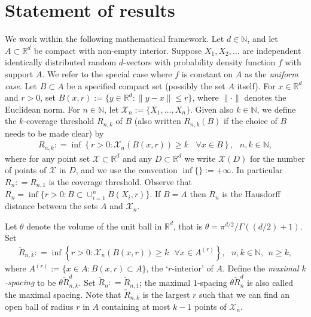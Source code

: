 \documentclass[12pt]{article}
\newcommand{\N}{\mathbb{N}}
\newcommand{\cX}{\mathcal{X}}
\newcommand{\X}{\mathcal{X}}
\newcommand{\tR}{{\tilde{R}}}
\newcommand{\R}{\mathbb{R}}
\newcommand{\eqco}{\setcounter{equation}{0}}
\newcommand{\thco}{\setcounter{theo}{0}}
\newcommand{\prco}{\setcounter{prop}{0}}
\newcommand{\laco}{\setcounter{lemm}{0}}
\newcommand{\coco}{\setcounter{coro}{0}}
\newcommand{\cjco}{\setcounter{conj}{0}}
\newcommand{\deco}{\setcounter{defn}{0}}
\newcommand{\allco}{\eqco  \thco \prco \laco \coco \cjco \deco}
\begin{document}
\section{Statement of results}
\allco
We work within the following mathematical framework.  Let $d \in \N$,
and let $A \subset \R^d$ be compact with non-empty interior.
Suppose $X_1,X_2,\ldots$ are independent identically distributed
random $d$-vectors with probability density function
$f$ with support
 $A $. We refer to the special case where $f$ is constant on $A$
 as the {\em uniform case}.
 Let $B \subset A$ be a  specified compact set (possibly
the set $A$ itself).
For $x \in \R^d$ and $r>0$, set $B(x,r):= \{y \in \R^d:\|y-x\| \leq r\}$,
where $\|\cdot\|$ denotes the Euclidean norm.
For $n \in \N$,  let $\X_n:= \{X_1,\ldots,X_n\}$.
Given also $k \in \N$, we
 define the $k$-coverage threshold $R_{n,k}$ of $B$
 (also written $R_{n,k}(B)$ if the choice of $B$ needs to be made clear)
 by
\begin{align}
R_{n,k} : =
 \inf \left\{ r >0: \X_n   (B(x,r)) \geq k 
~~~~ \forall x \in B \right\},
~~~ n,k  \in \N,
	\label{e:defRnk}
\end{align}
where for any point set $\X \subset \R^d$ and any $D \subset \R^d$ we write
$\X(D)$ for the number of points of $\X$ in $D$,
 and we use the convention $\inf\{\} := +\infty$.
In particular $R_n : = R_{n,1}$ is the coverage threshold.  Observe that
$R_n  = \inf \{ r >0: B \subset \cup_{i=1}^n B(X_i,r) \}$.
If $B=A$ then $R_n$ is the Hausdorff distance between the sets $A$ and
$\X_n$.


Let $\theta$ denote the volume of the unit ball in $\R^d$,
that is $\theta = \pi^{d/2}/\Gamma((d/2)+1)$.  Set
\begin{align}
\tilde{R}_{n,k} : = \inf \left\{ r >0: \X_n (B(x,r))
\geq k ~~~ \forall x \in  A^{(r)} \right\},~~~ n,k \in \N, ~~ n \geq k,
\label{eqmaxspac}
	\end{align}
where $A^{(r)} := \{x \in A: B(x,r) \subset A\}$, the `$r$-interior' of $A$.  
Define the {\em maximal $k$-spacing} to be $\theta \tilde{R}_{n,k}^d$.
Set $\tR_n: = \tR_{n,1}$; the maximal 1-spacing $\theta \tilde{R}^d_n$
is also called the maximal spacing.  
Note that $\tilde{R}_{n,k} $ is the largest $r$ 
such that we can find an open ball of radius $r$ in $A$ containing
at most $k-1$ points of $\cX_n$.
\end{document}

